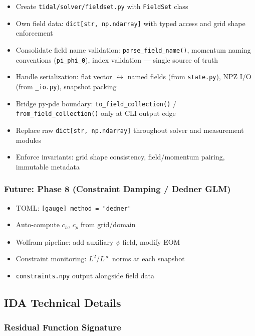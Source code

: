 \begin{itemize}
  \item[$\square$] Create \texttt{tidal/solver/fieldset.py} with \texttt{FieldSet} class
  \item[$\square$] Own field data: \texttt{dict[str, np.ndarray]} with typed access and grid shape enforcement
  \item[$\square$] Consolidate field name validation: \texttt{parse\_field\_name()}, momentum naming conventions
    (\texttt{pi\_phi\_0}), index validation --- single source of truth
  \item[$\square$] Handle serialization: flat vector $\leftrightarrow$ named fields (from \texttt{state.py}), NPZ I/O
    (from \texttt{\_io.py}), snapshot packing
  \item[$\square$] Bridge py-pde boundary: \texttt{to\_field\_collection()} / \texttt{from\_field\_collection()} only
    at CLI output edge
  \item[$\square$] Replace raw \texttt{dict[str, np.ndarray]} throughout solver and measurement modules
  \item[$\square$] Enforce invariants: grid shape consistency, field/momentum pairing, immutable metadata
\end{itemize}

\subsubsection{Future: Phase 8 (Constraint Damping / Dedner GLM)}
\label{sec:phase8}

\begin{itemize}
  \item[$\square$] TOML: \texttt{[gauge] method = "dedner"}
  \item[$\square$] Auto-compute $c_h$, $c_p$ from grid/domain
  \item[$\square$] Wolfram pipeline: add auxiliary $\psi$ field, modify EOM
  \item[$\square$] Constraint monitoring: $L^2$/$L^\infty$ norms at each snapshot
  \item[$\square$] \texttt{constraints.npy} output alongside field data
\end{itemize}

\subsection{IDA Technical Details}
\label{sec:ida-details}

\subsubsection{Residual Function Signature}
\label{sec:resfn-signature}

